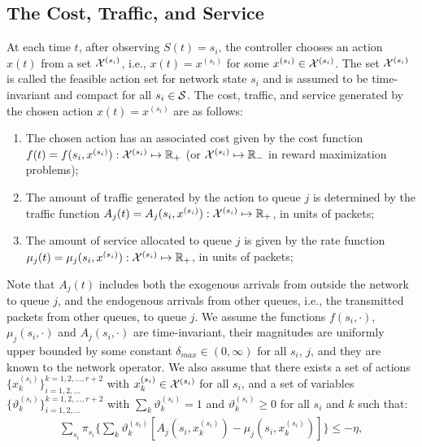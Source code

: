 \documentclass[journal]{IEEEtran}
\newcommand{\script}[1]{{{\cal{#1} }}}
\begin{document}
\subsection{The Cost, Traffic, and Service}\label{subsection:costtrafficservice}
At each time $t$, after observing $S(t)=s_i$, the controller chooses an action $x(t)$ from a set $\script{X}^{(s_i)}$, i.e., $x(t)= x^{(s_i)}$ for some $x^{(s_i)}\in\script{X}^{(s_i)}$. The set $\script{X}^{(s_i)}$ is called the feasible action set for network state $s_i$ and is assumed to be time-invariant and compact for all $s_i\in\script{S}$.  The cost, traffic, and service generated by the chosen action $x(t)=x^{(s_i)}$ are as follows:
\begin{enumerate}
\item[(a)] The chosen action has an associated cost given by the cost function $f(t)=f(s_i, x^{(s_i)}): \script{X}^{(s_i)}\mapsto \mathbb{R}_+$ (or $\script{X}^{(s_i)}\mapsto\mathbb{R}_-$ in reward maximization problems);

\item[(b)] The amount of traffic generated by the action to queue $j$ is determined by the traffic function $A_j(t)=A_{j}(s_i, x^{(s_i)}): \script{X}^{(s_i)}\mapsto \mathbb{R}_{+}$, in units of packets; 

\item[(c)] The amount of service allocated to queue $j$ is given by the rate function $\mu_j(t)=\mu_{j}(s_i, x^{(s_i)}): \script{X}^{(s_i)}\mapsto \mathbb{R}_{+}$, in units of packets;

 \end{enumerate}
Note that $A_j(t)$ includes both the exogenous arrivals from outside the network to queue $j$, and the endogenous arrivals from other queues, i.e., the transmitted packets from other queues, to queue $j$. We assume the functions $f(s_i, \cdot)$, $\mu_{j}(s_i, \cdot)$ and $A_{j}(s_i, \cdot)$ are time-invariant, their magnitudes are uniformly upper bounded by some constant $\delta_{max}\in(0,\infty)$ for all $s_i$, $j$, and they are known to the network operator. We also assume that there exists a set of actions $\{x^{(s_i)}_k\}_{i=1, 2, ...}^{k=1,2, ..., r+2}$ with $x^{(s_i)}_k\in\script{X}^{(s_i)}$ for all $s_i$, and a set of variables $\{\vartheta^{(s_i)}_k\}_{i=1, 2, ...}^{k=1,2, ..., r+2}$ with $\sum_k\vartheta^{(s_i)}_k=1$  and $\vartheta^{(s_i)}_k\geq0$ for all $s_i$ and $k$ such that:  
\begin{eqnarray}
\sum_{s_i}\pi_{s_i}\big\{\sum_k\vartheta^{(s_i)}_k[A_{j}(s_i, x^{(s_i)}_k)-\mu_{j}(s_i, x^{(s_i)}_k)]\big\}\leq -\eta,\label{eq:slackness}
\end{eqnarray}
\end{document}
